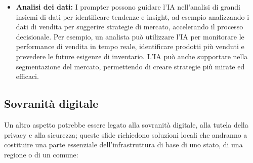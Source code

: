 \begin{itemize}
                \item \textbf{Analisi dei dati:} I prompter possono guidare l'IA nell'analisi di grandi  insiemi di dati per identificare tendenze e insight, ad esempio analizzando i dati di vendita per suggerire strategie di mercato, accelerando il processo decisionale. Per esempio, un analista può utilizzare l'IA per monitorare le performance di vendita in tempo reale, identificare prodotti più venduti e prevedere le future esigenze di inventario. L'IA può anche supportare nella segmentazione del mercato, permettendo di creare strategie più mirate ed efficaci.
            \end{itemize}
        
    \subsection{Sovranità digitale}
        Un altro aspetto potrebbe essere legato alla sovranità digitale, alla tutela della privacy e alla sicurezza; queste sfide richiedono soluzioni locali che andranno a costituire una parte essenziale dell'infrastruttura di base di uno stato, di una regione o di un comune:
    
